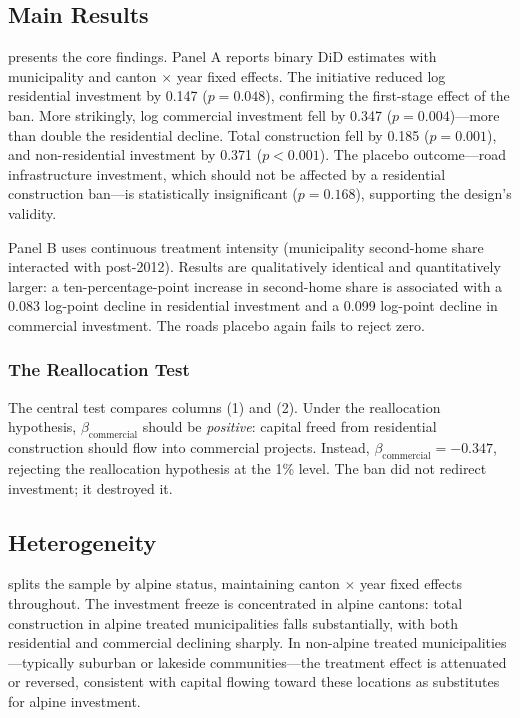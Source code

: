\documentclass[12pt]{article}
\begin{document}
\subsection{Main Results}



 presents the core findings. Panel A reports binary DiD estimates with municipality and canton $\times$ year fixed effects. The initiative reduced log residential investment by 0.147 ($p = 0.048$), confirming the first-stage effect of the ban. More strikingly, log commercial investment fell by 0.347 ($p = 0.004$)---more than double the residential decline. Total construction fell by 0.185 ($p = 0.001$), and non-residential investment by 0.371 ($p < 0.001$). The placebo outcome---road infrastructure investment, which should not be affected by a residential construction ban---is statistically insignificant ($p = 0.168$), supporting the design's validity.

Panel B uses continuous treatment intensity (municipality second-home share interacted with post-2012). Results are qualitatively identical and quantitatively larger: a ten-percentage-point increase in second-home share is associated with a 0.083 log-point decline in residential investment and a 0.099 log-point decline in commercial investment. The roads placebo again fails to reject zero.

\subsubsection*{The Reallocation Test} The central test compares columns (1) and (2). Under the reallocation hypothesis, $\beta_{\text{commercial}}$ should be \textit{positive}: capital freed from residential construction should flow into commercial projects. Instead, $\beta_{\text{commercial}} = -0.347$, rejecting the reallocation hypothesis at the 1\% level. The ban did not redirect investment; it destroyed it.

\subsection{Heterogeneity}



 splits the sample by alpine status, maintaining canton $\times$ year fixed effects throughout. The investment freeze is concentrated in alpine cantons: total construction in alpine treated municipalities falls substantially, with both residential and commercial declining sharply. In non-alpine treated municipalities---typically suburban or lakeside communities---the treatment effect is attenuated or reversed, consistent with capital flowing toward these locations as substitutes for alpine investment.
\end{document}
